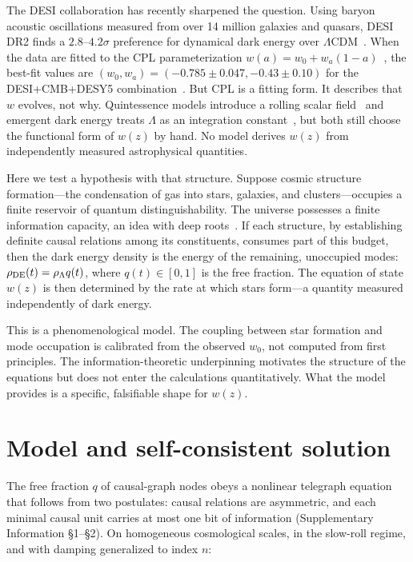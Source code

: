 \documentclass[12pt,a4paper]{article}
\begin{document}
The DESI collaboration has recently sharpened the question. Using baryon acoustic oscillations measured from over 14 million galaxies and quasars, DESI DR2 finds a $2.8$--$4.2\sigma$ preference for dynamical dark energy over $\Lambda$CDM~\cite{desi2025}. When the data are fitted to the CPL parameterization $w(a)=w_0+w_a(1-a)$~\cite{chevallier2001}, the best-fit values are $(w_0,w_a)=(-0.785\pm0.047,-0.43\pm0.10)$ for the DESI+CMB+DESY5 combination~\cite{li2026}. But CPL is a fitting form. It describes that $w$ evolves, not why. Quintessence models introduce a rolling scalar field~\cite{tsujikawa2013} and emergent dark energy treats $\Lambda$ as an integration constant~\cite{li2024}, but both still choose the functional form of $w(z)$ by hand. No model derives $w(z)$ from independently measured astrophysical quantities.

Here we test a hypothesis with that structure. Suppose cosmic structure formation---the condensation of gas into stars, galaxies, and clusters---occupies a finite reservoir of quantum distinguishability. The universe possesses a finite information capacity, an idea with deep roots~\cite{thooft1993,susskind1995,verlinde2011,jacobson1995}. If each structure, by establishing definite causal relations among its constituents, consumes part of this budget, then the dark energy density is the energy of the remaining, unoccupied modes: $\rho_{\rm DE}(t)=\rho_\Lambda q(t)$, where $q(t)\in[0,1]$ is the free fraction. The equation of state $w(z)$ is then determined by the rate at which stars form---a quantity measured independently of dark energy.

This is a phenomenological model. The coupling between star formation and mode occupation is calibrated from the observed $w_0$, not computed from first principles. The information-theoretic underpinning motivates the structure of the equations but does not enter the calculations quantitatively. What the model provides is a specific, falsifiable shape for $w(z)$.

\section*{Model and self-consistent solution}

The free fraction $q$ of causal-graph nodes obeys a nonlinear telegraph equation that follows from two postulates: causal relations are asymmetric, and each minimal causal unit carries at most one bit of information (Supplementary Information \S1--\S2). On homogeneous cosmological scales, in the slow-roll regime, and with damping generalized to index $n$:
\end{document}
